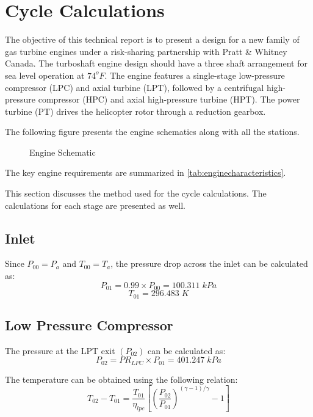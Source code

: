 \chapter{Cycle Calculations} \label{sec:cyclecalcs}
The objective of this technical report is to present a design for a new family of gas turbine engines under a risk-sharing partnership with Pratt \& Whitney Canada.
The turboshaft engine design should have a three shaft arrangement for sea level operation at $74^{o}F$.
The engine features a single-stage low-pressure compressor (LPC) and axial turbine 
(LPT), followed by a centrifugal high-pressure compressor (HPC) and axial 
high-pressure turbine (HPT). The power turbine (PT) drives the helicopter rotor 
through a reduction gearbox. 

The following figure presents the engine schematics along with all the stations.
\vspace{20pt}
\begin{figure}[H]
  \centering
  
  \caption{Engine Schematic}
  \label{fig:enter-label}
\end{figure} 

\clearpage

The key engine requirements are summarized in \autoref{tab:enginecharacteristics}.
 


This section discusses the method used for the cycle calculations. The calculations for each stage are presented as well.

\section{Inlet}
Since $P_{00} = P_a$ and $T_{00} = T_a$, the pressure drop across the inlet can be calculated as:
$$P_{01} = 0.99 \times P_{00} = 100.311 \; kPa$$
$$T_{01} = 296.483 \; K$$

\section{Low Pressure Compressor} \label{lpc}
The pressure at the LPT exit $(P_{02})$ can be calculated as:
$$P_{02} = PR_{LPC} \times P_{01} = 401.247 \; kPa$$

The temperature can be obtained using the following relation:
\begin{equation}
  T_{02} - T_{01} = \frac{T_{01}}{\eta_{lpc}} \left[  \left( \frac{P_{02}}{P_{01}} \right) ^{(\gamma - 1)/\gamma}  - 1  \right]
\end{equation}

